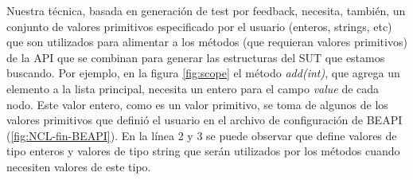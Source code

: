 Nuestra técnica, basada en generación de test por feedback, necesita, también, un conjunto de valores primitivos especificado por el usuario (enteros, strings, etc) que son utilizados para alimentar a los métodos (que requieran valores primitivos) de la API que se combinan para generar las estructuras del SUT que estamos buscando.
Por ejemplo, en la figura \ref{fig:scope} el método \emph{add(int)}, que agrega un elemento a la lista principal, necesita un entero para el campo \emph{value} de cada nodo. Este valor entero, como es un valor primitivo, se toma de algunos de los valores primitivos que definió el usuario en el archivo de configuración de BEAPI (\ref{fig:NCL-fin-BEAPI}). En la línea 2 y 3 se puede observar que define valores de tipo enteros y valores de tipo string que serán utilizados por los métodos cuando necesiten valores de este tipo. 
\\

